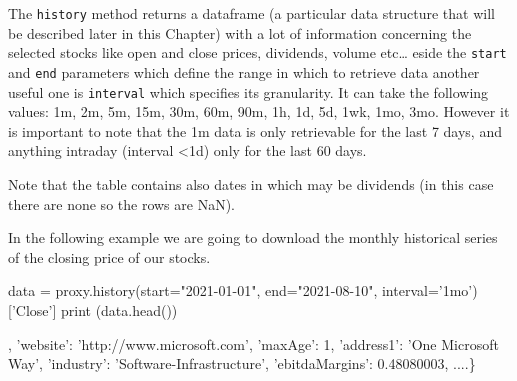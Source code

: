 The \texttt{history} method returns a dataframe (a particular data structure that will be described later in this Chapter) with a lot of information concerning the selected stocks like open and close prices, dividends, volume etc\ldots
eside the \texttt{start} and \texttt{end} parameters which define the range in which to retrieve data another useful one is \texttt{interval} which specifies its granularity. It can take the following values: 1m, 2m, 5m, 15m, 30m, 60m, 90m, 1h, 1d, 5d, 1wk, 1mo, 3mo. However it is important to note that the 1m data is only retrievable for the last 7 days, and anything intraday (interval <1d) only for the last 60 days.

Note that the table contains also dates in which may be dividends (in this case there are none so the rows are NaN).
  
In the following example we are going to download the monthly historical series of the closing price of our stocks.

\begin{ipython}
data = proxy.history(start="2021-01-01", end="2021-08-10", interval='1mo')['Close']
print (data.head())
\end{ipython}
, 
'website': 'http://www.microsoft.com', 'maxAge': 1, 'address1': 'One Microsoft Way', 
'industry': 'Software-Infrastructure', 'ebitdaMargins': 0.48080003, ....\}
\end{ioutput}

